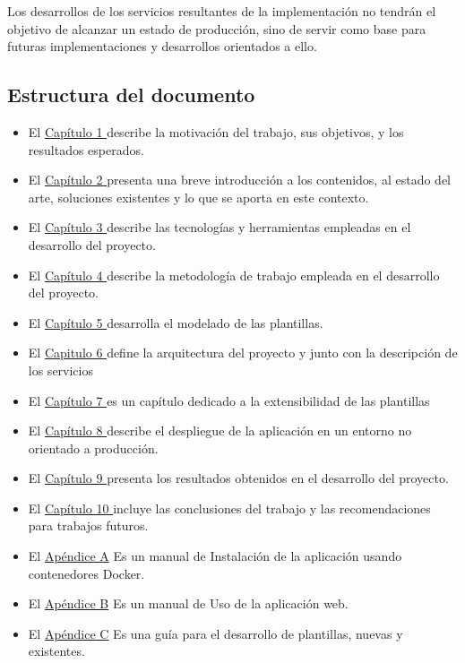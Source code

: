 \documentclass[12pt, a4paper, twoside]{article}
\begin{document}
Los desarrollos de los servicios resultantes de la implementación no tendrán el objetivo de alcanzar un estado de producción, sino de servir como base para futuras implementaciones y desarrollos orientados a ello. 

\subsection{Estructura del documento}

\begin{itemize}[label=\textbullet]
	\item El \hyperref[sec:Introduccion]{Capítulo 1 } describe la motivación del trabajo, sus objetivos, y los resultados esperados.
	\item El \hyperref[sec:Estado del Arte]{Capítulo 2 } presenta una breve introducción a los contenidos, al estado del arte, soluciones existentes y lo que se aporta en este contexto.
	\item El \hyperref[sec:Tecnologias Empleadas]{Capítulo 3 } describe las tecnologías y herramientas empleadas en el desarrollo del proyecto.
	\item El \hyperref[sec:Metodologia]{Capítulo 4 } describe la metodología de trabajo empleada en el desarrollo del proyecto.
	\item El \hyperref[sec:Modelado de las plantillas]{Capítulo 5 } desarrolla el modelado de las plantillas.
	\item El \hyperref[sec:Arquitectura y Descripción del sistema]{Capitulo 6 } define la arquitectura del proyecto y junto con la descripción de los servicios
	\item El \hyperref[sec:Extensibilidad]{Capítulo 7 } es un capítulo dedicado a la extensibilidad de las plantillas
	\item El \hyperref[sec:Despliegue de la aplicación]{Capítulo 8 }  describe el despliegue de la aplicación en un entorno no orientado a producción.
	\item El \hyperref[sec:Resultados]{Capítulo 9 } presenta los resultados obtenidos en el desarrollo del proyecto.
	\item El \hyperref[sec:Conclusiones]{Capítulo 10 } incluye las conclusiones del trabajo y las recomendaciones para trabajos futuros.
	\item El \hyperref[sec:Manual de Instalación]{Apéndice A} Es un manual de Instalación de la aplicación usando contenedores Docker.
	\item El \hyperref[sec:Manual de Uso]{Apéndice B} Es un manual de Uso de la aplicación web.
	\item El \hyperref[sec:Manual de Desarrollo]{Apéndice C} Es una guía para el desarrollo de plantillas, nuevas y existentes.
\end{itemize}
\end{document}
